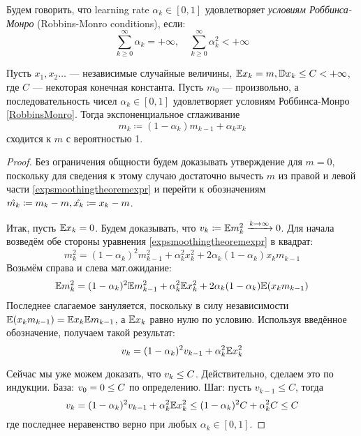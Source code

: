 \begin{definition}
Будем говорить, что learning rate $\alpha_k \in [0, 1]$ удовлетворяет \emph{условиям Роббинса-Монро} (Robbins-Monro conditions), если:
\begin{equation}\label{RobbinsMonro}
\sum_{k \ge 0}^{\infty} \alpha_k = +\infty, \quad \sum_{k \ge 0}^{\infty} \alpha_k^2 < +\infty
\end{equation}
\end{definition}

\begin{theoremBox}[label=th:expsmoothingconvergence]{}
Пусть $x_1, x_2 \dots$ --- независимые случайные величины, $\mathbb{E} x_k = m, \mathbb{D} x_k \le C < +\infty$, где $C$ --- некоторая конечная константа. Пусть $m_0$ --- произвольно, а последовательность чисел $\alpha_k \in [0, 1]$ удовлетворяет условиям Роббинса-Монро \eqref{RobbinsMonro}. Тогда экспоненциальное сглаживание 
\begin{equation}\label{expsmoothingtheoremexpr}
m_k \coloneqq (1 - \alpha_k) m_{k-1} + \alpha_k x_k
\end{equation}
сходится к $m$ с вероятностью 1.
\begin{proof}
Без ограничения общности будем доказывать утверждение для $m = 0$, поскольку для сведения к этому случаю достаточно вычесть $m$ из правой и левой части \eqref{expsmoothingtheoremexpr} и перейти к обозначениям $\hat{m_k} \HM\coloneqq m_k - m, \hat{x_k} \HM\coloneqq x_k \HM- m$.

Итак, пусть $\E x_k \HM= 0$. Будем доказывать, что $v_k \HM\coloneqq \E m_k^2 \xrightarrow{k \to \infty} 0$. Для начала возведём обе стороны уравнения \eqref{expsmoothingtheoremexpr} в квадрат:
$$m_{k}^2 = (1 - \alpha_k)^2 m^2_{k-1} + \alpha^2_k x^2_k + 2\alpha_k(1 - \alpha_k)x_km_{k-1}$$
Возьмём справа и слева мат.ожидание:
$$\mathbb{E} m_{k}^2 = (1 - \alpha_k)^2 \mathbb{E} m^2_{k-1} + \alpha^2_k \mathbb{E} x^2_k + 2\alpha_k(1 - \alpha_k)\mathbb{E} (x_k m_{k-1})$$
Последнее слагаемое зануляется, поскольку в силу независимости $\E (x_k m_{k-1}) \HM= \E x_k \E m_{k-1}$, а $\mathbb{E} x_k$ равно нулю по условию. Используя введённое обозначение, получаем такой результат:
\begin{equation}\label{recurrentdispersion}
v_{k} = (1 - \alpha_k)^2 v_{k-1} + \alpha_k^2 \mathbb{E} x_k^2
\end{equation}

Сейчас мы уже можем доказать, что $v_k \HM\le C$. Действительно, сделаем это по индукции. База: $v_0 \HM= 0 \HM\le C$ по определению. Шаг: пусть $v_{k-1} \le C$, тогда
$$v_{k} = (1 - \alpha_k)^2 v_{k-1} + \alpha_k^2 \mathbb{E} x_k^2 \le (1 - \alpha_k)^2 C + \alpha_k^2 C \le C$$
где последнее неравенство верно при любых $\alpha_k \in [0, 1]$.


\end{proof}
\end{theoremBox}
